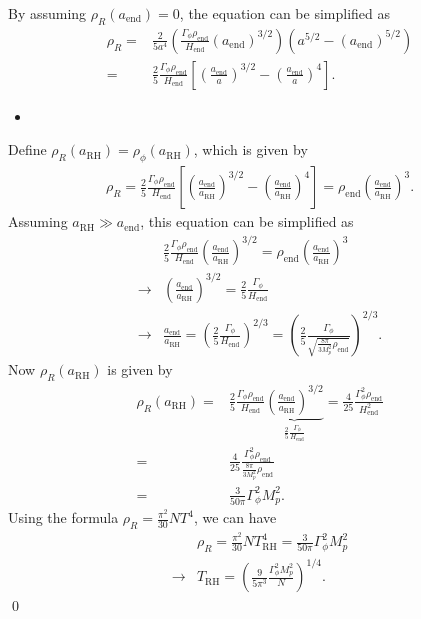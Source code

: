 By assuming $\rho_R(a_\text{end})=0$, the equation can be simplified as 
\begin{align}
    \rho_R =& \frac{2}{5a^4} \left( \frac{\Gamma_\phi \rho_\text{end} }{H_\text{end}} \left(a_\text{end}\right)^{3/2}\right) \left( a^{5/2}- (a_\text{end})^{5/2}  \right)\\
    =&\frac{2}{5}\frac{\Gamma_\phi \rho_\text{end} }{H_\text{end}}\left[\left(\frac{a_\text{end}}{a}\right)^{3/2} -\left(\frac{a_\text{end}}{a}\right)^{4}\right].
\end{align}

\begin{itemize}
    \item [(c)]
\end{itemize}
Define $\rho_R(a_\text{RH})=\rho_\phi(a_\text{RH})$, which is given by 
\begin{align}
    \rho_R=\frac{2}{5}\frac{\Gamma_\phi \rho_\text{end} }{H_\text{end}}\left[\left(\frac{a_\text{end}}{a_\text{RH}}\right)^{3/2} -\left(\frac{a_\text{end}}{a_\text{RH}}\right)^{4}\right]=\rho_\text{end}  \left(\frac{a_\text{end}}{a_\text{RH}}\right)^3.
\end{align}
Assuming $a_\text{RH}\gg a_\text{end}$, this equation can be simplified as 
\begin{align}
    &\frac{2}{5}\frac{\Gamma_\phi \rho_\text{end} }{H_\text{end}} \left(\frac{a_\text{end}}{a_\text{RH}}\right)^{3/2} =  \rho_\text{end}  \left(\frac{a_\text{end}}{a_\text{RH}}\right)^3\\
    \rightarrow& \left(\frac{a_\text{end}}{a_\text{RH}}\right)^{3/2} = \frac{2}{5}\frac{\Gamma_\phi  }{H_\text{end}} \\
    \rightarrow& \frac{a_\text{end}}{a_\text{RH}} = \left(\frac{2}{5}\frac{\Gamma_\phi  }{H_\text{end}}\right)^{2/3}=\left(\frac{2}{5}\frac{\Gamma_\phi  }{\sqrt{\frac{8\pi}{3M_p^2} \rho_\text{end}}}\right)^{2/3}.
\end{align}
Now $\rho_R(a_\text{RH})$ is given by 
\begin{align}
    \rho_R(a_\text{RH}) =&  \frac{2}{5}\frac{\Gamma_\phi \rho_\text{end} }{H_\text{end}} \underbrace{\left(\frac{a_\text{end}}{a_\text{RH}}\right)^{3/2}}_{\frac{2}{5}\frac{\Gamma_\phi  }{H_\text{end}}}=\frac{4}{25}\frac{\Gamma_\phi^2 \rho_\text{end} }{H_\text{end}^2}\\
    =&\frac{4}{25}\frac{\Gamma_\phi^2 \rho_\text{end} }{\frac{8\pi}{3M_p^2} \rho_\text{end}}\\
    =&\frac{3}{50\pi} \Gamma_\phi^2 M_p^2.
\end{align}
Using the formula $\rho_R=\frac{\pi^2}{30} N T^4$, we can have 
\begin{align}
    &\rho_R=\frac{\pi^2}{30} N T_\text{RH}^4 = \frac{3}{50\pi} \Gamma_\phi^2 M_p^2\\
    \rightarrow& T_\text{RH} = \left(\frac{9}{5\pi^3}\frac{\Gamma_\phi^2 M_p^2}{N}\right)^{1/4}.
\end{align}
\qed


